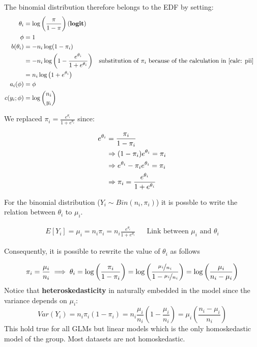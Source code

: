       The binomial distribution therefore belongs to the EDF by setting:
      \begin{align*}
        \theta_i     &= \log\left(\frac{\pi}{1-\pi}\right) \text{(\textbf{logit})} \\
        \phi         &= 1 \\
        b(\theta_i)  &= - n_i \log(1-\pi_i)\\
                     &= -n_i \log\left(1-\frac{e^{\theta_i}}{1 + e^{\theta_i}}\right) 
                     &&\text{substitution of } \pi_i \text{ because of the calculation in \ref{calc: pii}} \\
                     &= n_i \log\left(1 + e^{\theta_i}\right) \\
        a_i(\phi)    &= \phi \\ %
        c(y_i; \phi) &= \log\binom{n_i}{y_i}
      \end{align*}

We replaced  $\pi_i = \frac{e^{\theta_i}}{1 + e^{\theta_i}}$ since:

	\begin{align} \label{calc: pii}
	e^{\theta_i} &= \frac{\pi_i}{1-\pi_i} \\
  &\Rightarrow (1-\pi_i)e^{\theta_i} = \pi_i \notag\\ 
	&\Rightarrow e^{\theta_i} - \pi_i e^{\theta_i} = \pi_i \notag\\
  &\Rightarrow \pi_i = \frac{e^{\theta_i}}{1+ e^{\theta_i}} \notag
	\end{align}

      For the binomial distribution ($Y_i \sim Bin(n_i, \pi_i)$) it is possble
      to write the relation between $\theta_i$ to $\mu_i$.

      \begin{align*}
        E[Y_i] = \mu_i = n_i\pi_i = n_i\frac{e^{\theta_i}}{1 + e^{\theta_i}} && \text{Link between } \mu_i \text{ and } \theta_i  
      \end{align*}
      
      Consequently, it is possible to rewrite the value of $\theta_i$ as follows

      $$\pi_i = \frac{\mu_i}{n_i} \implies \theta_i =
      \log\left(\frac{\pi_i}{1-\pi_i}\right) =
      \log\left(\frac{\nicefrac{\mu_i}{n_i}}{1-\nicefrac{\mu_i}{n_i}}\right)=\log\left(\frac{\mu_i}{n_i-\mu_i}\right)$$
      Notice that \textbf{heteroskedasticity} in naturally embedded in the model
      since the variance depends on $\mu_i$:
      $$Var(Y_i) = n_i\pi_i(1-\pi_i) =
      n_i\frac{\mu_i}{n_i}\left(1-\frac{\mu_i}{n_i}\right) =
      \mu_i\left(\frac{n_i - \mu_i}{n_i}\right)$$ This hold true for all GLMs
      but linear models which is the only homoskedastic model of the group. Most
      datasets are not homoskedastic. 

